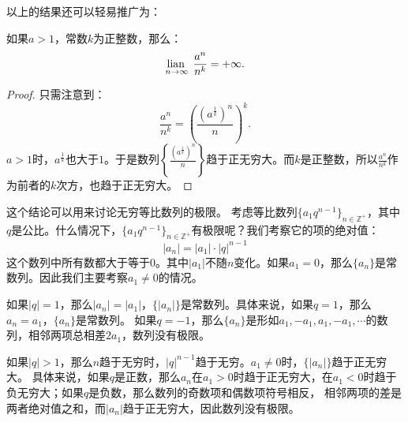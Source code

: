 \documentclass[12pt,UTF8]{ctexbook}
\begin{document}
以上的结果还可以轻易推广为：
\begin{et}
    如果$a>1$，常数$k$为正整数，那么：
    $$ \underset{n\to\infty}{\operatorname{lian}\,}\,\; \frac{a^n}{n^k} = +\infty.$$
\end{et}
\begin{proof}
    只需注意到：
    $$\frac{a^n}{n^k} = \left(\frac{\left(a^{\frac{1}{k}}\right)^n}{n}\right)^k.$$
    $a>1$时，$\displaystyle a^{\frac{1}{k}}$也大于$1$。于是数列$\displaystyle\left\{\frac{\left(a^{\frac{1}{k}}\right)^n}{n}\right\}$趋于正无穷大。而$k$是正整数，所以$\frac{a^n}{n^k}$作为前者的$k$次方，也趋于正无穷大。
\end{proof}

这个结论可以用来讨论无穷等比数列的极限。
考虑等比数列$\{a_1 q^{n-1}\}_{n\in\mathbb{Z}^+}$，其中$q$是公比。什么情况下，$\{a_1 q^{n-1}\}_{n\in\mathbb{Z}^+}$有极限呢？我们考察它的项的绝对值：
$$|a_n| = |a_1|\cdot|q|^{n-1}$$
这个数列中所有数都大于等于$0$。其中$|a_1|$不随$n$变化。如果$a_1=0$，那么$\{a_n\}$是常数列。因此我们主要考察$a_1 \neq 0$的情况。

如果$|q|=1$，那么$|a_n| = |a_1|$，$\{|a_n|\}$是常数列。具体来说，如果$q=1$，那么$a_n = a_1$，$\{a_n\}$是常数列。
如果$q = -1$，那么$\{a_n\}$是形如$a_1, -a_1, a_1, -a_1, \cdots$的数列，相邻两项总相差$2a_1$，数列没有极限。

如果$|q| > 1$，那么$n$趋于无穷时，$|q|^{n-1}$趋于无穷。$a_1 \neq 0$时，$\{|a_n|\}$趋于正无穷大。
具体来说，如果$q$是正数，那么$a_n$在$a_1>0$时趋于正无穷大，在$a_1<0$时趋于负无穷大；如果$q$是负数，那么数列的奇数项和偶数项符号相反，
相邻两项的差是两者绝对值之和，而$|a_n|$趋于正无穷大，因此数列没有极限。
\end{document}
